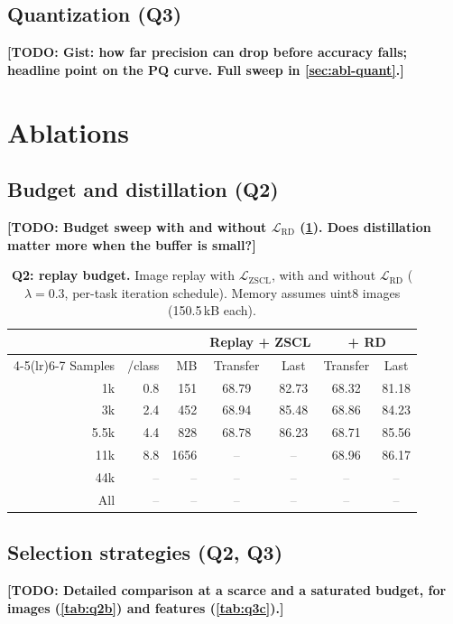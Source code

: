 \documentclass[10pt,twocolumn,letterpaper]{article}
\newcommand{\TODO}[1]{\textbf{\color{red}[TODO: #1]}}
\newcommand{\Q}[1]{\textbf{Q#1}\xspace}     %
\newcommand{\Lzscl}{\mathcal{L}_{\text{ZSCL}}}
\newcommand{\Lrd}{\mathcal{L}_{\text{RD}}}
\newcommand{\tbd}{\textcolor{gray}{--}}          %
\begin{document}
\subsection{Quantization (\Q{3})}
\label{sec:res-quant}
\TODO{Gist: how far precision can drop before accuracy falls; headline point on the PQ curve. Full sweep in \cref{sec:abl-quant}.}

\section{Ablations}
\label{sec:ablations}

\subsection{Budget and distillation (\Q{2})}
\label{sec:abl-budget}
\TODO{Budget sweep with and without $\Lrd$ (\cref{tab:q2a}). Does distillation matter more when the buffer is small?}

\begin{table}[t]
\centering
\small
\setlength{\tabcolsep}{3.5pt}
\caption{\textbf{\Q{2}: replay budget.} Image replay with $\Lzscl$, with
and without $\Lrd$ ($\lambda{=}0.3$, per-task iteration schedule). Memory
assumes uint8 images (150.5\,kB each).}
\label{tab:q2a}
\begin{tabular}{@{}rrr cc cc@{}}
\toprule
& & & \multicolumn{2}{c}{Replay + ZSCL} & \multicolumn{2}{c}{+ RD} \\
\cmidrule(lr){4-5}\cmidrule(lr){6-7}
Samples & /class & MB & Transfer & Last & Transfer & Last \\
\midrule
1k     & 0.8 & 151  & 68.79 & 82.73 & 68.32 & 81.18 \\
3k     & 2.4 & 452  & 68.94 & 85.48 & 68.86 & 84.23 \\
5.5k   & 4.4 & 828  & 68.78 & 86.23 & 68.71 & 85.56 \\
11k    & 8.8 & 1656 & \tbd  & \tbd  & 68.96 & 86.17 \\
44k    & \tbd & \tbd & \tbd & \tbd & \tbd & \tbd \\
All    & \tbd & \tbd & \tbd & \tbd & \tbd & \tbd \\
\bottomrule
\end{tabular}
\end{table}

\subsection{Selection strategies (\Q{2}, \Q{3})}
\label{sec:abl-select}
\TODO{Detailed comparison at a scarce and a saturated budget, for images (\cref{tab:q2b}) and features (\cref{tab:q3c}).}
\end{document}
